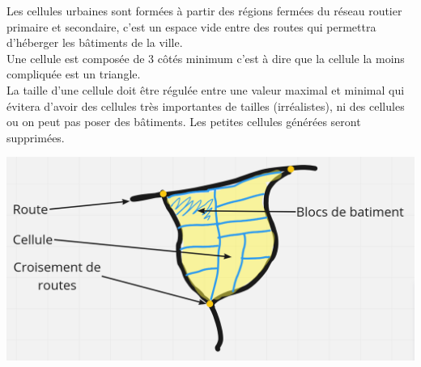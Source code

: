 {
Les cellules urbaines sont formées à partir des régions fermées du réseau routier primaire et secondaire, c’est un espace vide entre des routes qui permettra d'héberger les bâtiments de la ville.\\

Une cellule est composée de 3 côtés minimum c’est à dire que la cellule la moins compliquée est un triangle.\\

La taille d’une cellule doit être régulée entre une valeur maximal et minimal qui évitera d’avoir des cellules très importantes de tailles (irréalistes), ni des cellules ou on peut pas poser des bâtiments. Les petites cellules générées seront supprimées.

\begin{center}
  \centering
  \includegraphics[height = 6 cm]{images/cellule.png}\\
\end{center}

}
{}
